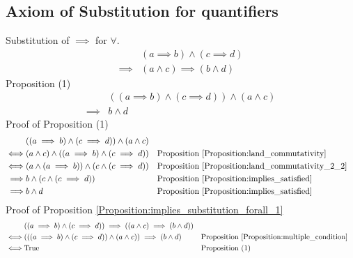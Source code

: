\subsection{Axiom of Substitution for quantifiers}
\begin{prop}
\label{Proposition:implies_substitution_forall_1}
Substitution of $\implies$ for $\forall$.
\begin{align*}
& (a \implies b) \land (c \implies d) \\
\implies & (a \land c) \implies (b \land d)
\end{align*}
Proposition (1)
\begin{align*}
& ((a \implies b) \land (c \implies d)) \land (a \land c) \\
\implies & b \land d
\end{align*}
Proof of Proposition (1)
\begin{align*}
& ((a \implies b) \land (c \implies d)) \land (a \land c) \\
\iff & (a \land c) \land ((a \implies b) \land (c \implies d))
& & \text{Proposition \ref{Proposition:land_commutativity}} \\
\iff & (a \land (a \implies b)) \land (c \land (c \implies d))
& & \text{Proposition \ref{Proposition:land_commutativity_2_2}} \\
\implies & b \land (c \land (c \implies d))
& & \text{Proposition \ref{Proposition:implies_satisfied}} \\
\implies & b \land d
& & \text{Proposition \ref{Proposition:implies_satisfied}} \\
\end{align*}
Proof of Proposition \ref{Proposition:implies_substitution_forall_1}
\begin{align*}
& ((a \implies b) \land (c \implies d)) \implies ((a \land c) \implies (b \land d)) \\
\iff & (((a \implies b) \land (c \implies d)) \land (a \land c)) \implies (b \land d)
& & \text{Proposition \ref{Proposition:multiple_condition}} \\
\iff & \text{True}
& & \text{Proposition (1)} \\
\end{align*}
\end{prop}

